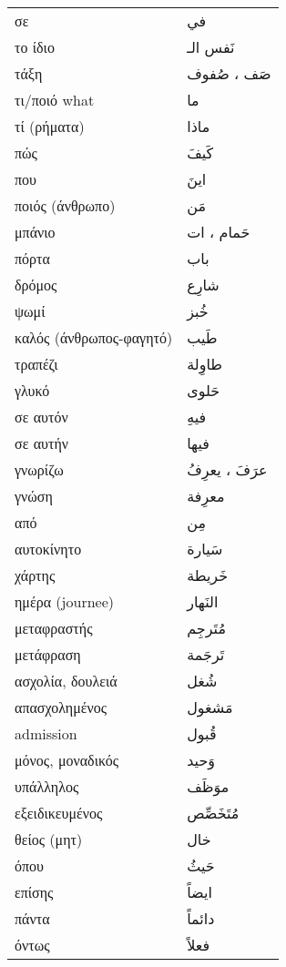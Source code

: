 \documentclass[twocolumn,a4paper]{article}
\newcommand{\ar}[1]{\textarabic{#1}}
\newcommand{\pl}{\raisebox{0.15ex}{\footnotesize ◍}}
\newcommand{\normpl}[1]{\ar{ #1، ات }}
\newcommand{\vrf}{\raisebox{0.15ex}{\footnotesize ◉}}
\newcommand{\mas}{\raisebox{0.15ex}{\footnotesize ◫}}
\begin{document}
\begin{mpsupertabular}{ P{0.5\textwidth} P{0.5\textwidth} }
σε          & \ar{ في } \\
το ίδιο     & \ar{ نَفس الـ } \\
τάξη \pl    & \ar{ صَف ، صُفوف } \\
τι/ποιό what & \ar{ ما } \\
τί (ρήματα) & \ar{ ماذا } \\
πώς         & \ar{ كَيفَ } \\
που         & \ar{ اينَ } \\
ποιός (άνθρωπο)& \ar{ مَن } \\
μπάνιο \pl  & \normpl{ حَمام } \\
πόρτα       & \ar{ باب } \\
δρόμος      & \ar{ شارِع } \\
ψωμί        & \ar{ خُبز } \\
καλός (άνθρωπος-φαγητό) & \ar{ طَيب } \\
τραπέζι     & \ar{ طاوِلة } \\
γλυκό       & \ar{ حَلوى } \\
σε αυτόν    & \ar{ فيهِ  } \\
σε αυτήν    & \ar{ فيها } \\
γνωρίζω \vrf & \ar{ عرَفَ ، يعرِفُ  } \\
γνώση  \mas  & \ar{ معرِفة } \\
από         & \ar{ مِن } \\
αυτοκίνητο  & \ar{ سَيارة } \\
χάρτης      & \ar{ خَريطة } \\
ημέρα (journee) & \ar{ النَهار } \\
μεταφραστής     & \ar{ مُتَرجِم } \\
μετάφραση       & \ar{ تَرجَمة } \\
ασχολία, δουλειά & \ar{ شُغل } \\
απασχολημένος   & \ar{ مَشغول } \\
admission   & \ar{ قُبول } \\
μόνος, μοναδικός & \ar{ وَحيد } \\
υπάλληλος   & \ar{ موَظَف } \\
εξειδικευμένος  & \ar{ مُتَخَصِّص } \\ %
θείος (μητ) & \ar{ خال } \\
όπου        & \ar{ حَيثُ } \\
επίσης      & \ar{ ايضاً } \\
πάντα       & \ar{ دائماً } \\
όντως       & \ar{ فعلاً } \\

\end{mpsupertabular}
\end{document}
